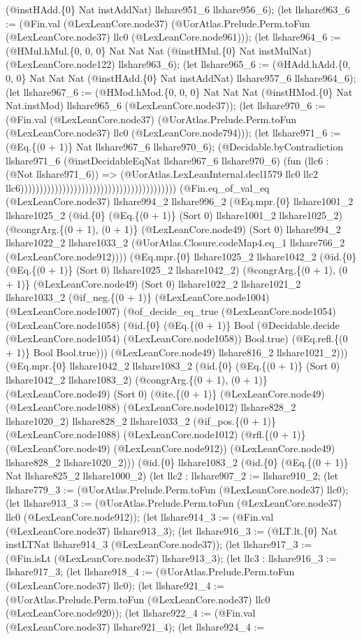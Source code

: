 \documentclass[11pt]{article}
\begin{document}
(@instHAdd.\{0\} Nat instAddNat) llshare951\_6 llshare956\_6); (let llshare963\_6 := (@Fin.val (@LexLeanCore.node37) (@UorAtlas.Prelude.Perm.toFun (@LexLeanCore.node37) llc0 (@LexLeanCore.node961))); (let llshare964\_6 := (@HMul.hMul.\{0, 0, 0\} Nat Nat Nat (@instHMul.\{0\} Nat instMulNat) (@LexLeanCore.node122) llshare963\_6); (let llshare965\_6 := (@HAdd.hAdd.\{0, 0, 0\} Nat Nat Nat (@instHAdd.\{0\} Nat instAddNat) llshare957\_6 llshare964\_6); (let llshare967\_6 := (@HMod.hMod.\{0, 0, 0\} Nat Nat Nat (@instHMod.\{0\} Nat Nat.instMod) llshare965\_6 (@LexLeanCore.node37)); (let llshare970\_6 := (@Fin.val (@LexLeanCore.node37) (@UorAtlas.Prelude.Perm.toFun (@LexLeanCore.node37) llc0 (@LexLeanCore.node794))); (let llshare971\_6 := (@Eq.\{(0 + 1)\} Nat llshare967\_6 llshare970\_6); (@Decidable.byContradiction llshare971\_6 (@instDecidableEqNat llshare967\_6 llshare970\_6) (fun (llc6 : (@Not llshare971\_6)) => (@UorAtlas.LexLeanInternal.decl1579 llc0 llc2 llc6))))))))))))))))))))))))))))))))))))))))) (@Fin.eq\_of\_val\_eq (@LexLeanCore.node37) llshare994\_2 llshare996\_2 (@Eq.mpr.\{0\} llshare1001\_2 llshare1025\_2 (@id.\{0\} (@Eq.\{(0 + 1)\} (Sort 0) llshare1001\_2 llshare1025\_2) (@congrArg.\{(0 + 1), (0 + 1)\} (@LexLeanCore.node49) (Sort 0) llshare994\_2 llshare1022\_2 llshare1033\_2 (@UorAtlas.Closure.codeMap4.eq\_1 llshare766\_2 (@LexLeanCore.node912)))) (@Eq.mpr.\{0\} llshare1025\_2 llshare1042\_2 (@id.\{0\} (@Eq.\{(0 + 1)\} (Sort 0) llshare1025\_2 llshare1042\_2) (@congrArg.\{(0 + 1), (0 + 1)\} (@LexLeanCore.node49) (Sort 0) llshare1022\_2 llshare1021\_2 llshare1033\_2 (@if\_neg.\{(0 + 1)\} (@LexLeanCore.node1004) (@LexLeanCore.node1007) (@of\_decide\_eq\_true (@LexLeanCore.node1054) (@LexLeanCore.node1058) (@id.\{0\} (@Eq.\{(0 + 1)\} Bool (@Decidable.decide (@LexLeanCore.node1054) (@LexLeanCore.node1058)) Bool.true) (@Eq.refl.\{(0 + 1)\} Bool Bool.true))) (@LexLeanCore.node49) llshare816\_2 llshare1021\_2))) (@Eq.mpr.\{0\} llshare1042\_2 llshare1083\_2 (@id.\{0\} (@Eq.\{(0 + 1)\} (Sort 0) llshare1042\_2 llshare1083\_2) (@congrArg.\{(0 + 1), (0 + 1)\} (@LexLeanCore.node49) (Sort 0) (@ite.\{(0 + 1)\} (@LexLeanCore.node49) (@LexLeanCore.node1088) (@LexLeanCore.node1012) llshare828\_2 llshare1020\_2) llshare828\_2 llshare1033\_2 (@if\_pos.\{(0 + 1)\} (@LexLeanCore.node1088) (@LexLeanCore.node1012) (@rfl.\{(0 + 1)\} (@LexLeanCore.node49) (@LexLeanCore.node912)) (@LexLeanCore.node49) llshare828\_2 llshare1020\_2))) (@id.\{0\} llshare1083\_2 (@id.\{0\} (@Eq.\{(0 + 1)\} Nat llshare825\_2 llshare1000\_2) (let llc2 : llshare907\_2 := llshare910\_2; (let llshare779\_3 := (@UorAtlas.Prelude.Perm.toFun (@LexLeanCore.node37) llc0); (let llshare913\_3 := (@UorAtlas.Prelude.Perm.toFun (@LexLeanCore.node37) llc0 (@LexLeanCore.node912)); (let llshare914\_3 := (@Fin.val (@LexLeanCore.node37) llshare913\_3); (let llshare916\_3 := (@LT.lt.\{0\} Nat instLTNat llshare914\_3 (@LexLeanCore.node37)); (let llshare917\_3 := (@Fin.isLt (@LexLeanCore.node37) llshare913\_3); (let llc3 : llshare916\_3 := llshare917\_3; (let llshare918\_4 := (@UorAtlas.Prelude.Perm.toFun (@LexLeanCore.node37) llc0); (let llshare921\_4 := (@UorAtlas.Prelude.Perm.toFun (@LexLeanCore.node37) llc0 (@LexLeanCore.node920)); (let llshare922\_4 := (@Fin.val (@LexLeanCore.node37) llshare921\_4); (let llshare924\_4 := 
\end{document}
